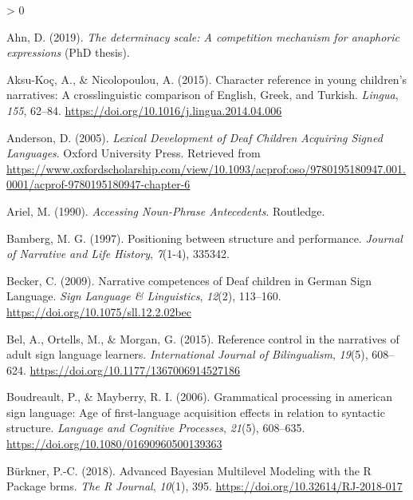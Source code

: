 \documentclass[
  english,
  doc,mask]{apa6}
\newlength{\cslhangindent}
\newenvironment{CSLReferences}[2] %
 {%
  \setlength{\parindent}{0pt}
  \ifodd #1 \everypar{\setlength{\hangindent}{\cslhangindent}}\ignorespaces\fi
  \ifnum #2 > 0
  \setlength{\parskip}{#2\baselineskip}
  \fi
 }%
 {}
\begin{document}
\begingroup
\setlength{\parindent}{-0.5in}
\setlength{\leftskip}{0.5in}

\hypertarget{refs}{}
\begin{CSLReferences}{1}{0}
\leavevmode\hypertarget{ref-ahn2019}{}%
Ahn, D. (2019). \emph{The determinacy scale: A competition mechanism for anaphoric expressions} (PhD thesis).

\leavevmode\hypertarget{ref-aksu-kouxe72015}{}%
Aksu-Koç, A., \& Nicolopoulou, A. (2015). Character reference in young children's narratives: A crosslinguistic comparison of English, Greek, and Turkish. \emph{Lingua}, \emph{155}, 62--84. \url{https://doi.org/10.1016/j.lingua.2014.04.006}

\leavevmode\hypertarget{ref-anderson2005}{}%
Anderson, D. (2005). \emph{Lexical Development of Deaf Children Acquiring Signed Languages}. Oxford University Press. Retrieved from \url{https://www.oxfordscholarship.com/view/10.1093/acprof:oso/9780195180947.001.0001/acprof-9780195180947-chapter-6}

\leavevmode\hypertarget{ref-ariel1990}{}%
Ariel, M. (1990). \emph{Accessing Noun-Phrase Antecedents}. Routledge.

\leavevmode\hypertarget{ref-bamberg1997}{}%
Bamberg, M. G. (1997). Positioning between structure and performance. \emph{Journal of Narrative and Life History}, \emph{7}(1-4), 335342.

\leavevmode\hypertarget{ref-becker2009}{}%
Becker, C. (2009). Narrative competences of Deaf children in German Sign Language. \emph{Sign Language \& Linguistics}, \emph{12}(2), 113--160. \url{https://doi.org/10.1075/sll.12.2.02bec}

\leavevmode\hypertarget{ref-bel2015}{}%
Bel, A., Ortells, M., \& Morgan, G. (2015). Reference control in the narratives of adult sign language learners. \emph{International Journal of Bilingualism}, \emph{19}(5), 608--624. \url{https://doi.org/10.1177/1367006914527186}

\leavevmode\hypertarget{ref-boudreault2006}{}%
Boudreault, P., \& Mayberry, R. I. (2006). Grammatical processing in american sign language: Age of first-language acquisition effects in relation to syntactic structure. \emph{Language and Cognitive Processes}, \emph{21}(5), 608--635. \url{https://doi.org/10.1080/01690960500139363}

\leavevmode\hypertarget{ref-buxfcrkner2018}{}%
Bürkner, P.-C. (2018). Advanced Bayesian Multilevel Modeling with the R Package brms. \emph{The R Journal}, \emph{10}(1), 395. \url{https://doi.org/10.32614/RJ-2018-017}


\end{CSLReferences}
\end{document}
